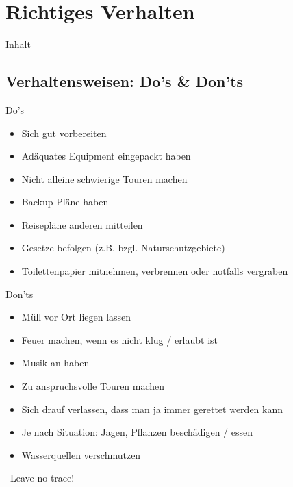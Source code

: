\documentclass[aspectratio=169]{beamer}
\begin{document}
	\section{Richtiges Verhalten}
		
		\begin{frame}[t]{Inhalt}
		\end{frame}
		
		\subsection{Verhaltensweisen: Do's \& Don'ts}
			
			\begin{frame}{Do's}
				\begin{itemize}
					\item Sich gut vorbereiten
					\item Adäquates Equipment eingepackt haben
					\item Nicht alleine schwierige Touren machen
					\item Backup-Pläne haben
					\item Reisepläne anderen mitteilen
					\item Gesetze befolgen (z.B. bzgl. Naturschutzgebiete)
					\item Toilettenpapier mitnehmen, verbrennen oder notfalls vergraben
				\end{itemize}
			\end{frame}
			
			\begin{frame}{Don'ts}
				\begin{itemize}
					\item Müll vor Ort liegen lassen
					\item Feuer machen, wenn es nicht klug / erlaubt ist
					\item Musik an haben
					\item Zu anspruchsvolle Touren machen
					\item Sich drauf verlassen, dass man ja immer gerettet werden kann
					\item Je nach Situation: Jagen, Pflanzen beschädigen / essen
					\item Wasserquellen verschmutzen
				\end{itemize}
				\pause
				\vspace{0.2cm}
				\textcolor{blue}{\textrightarrow}\ Leave no trace!
			\end{frame}
			
\end{document}

